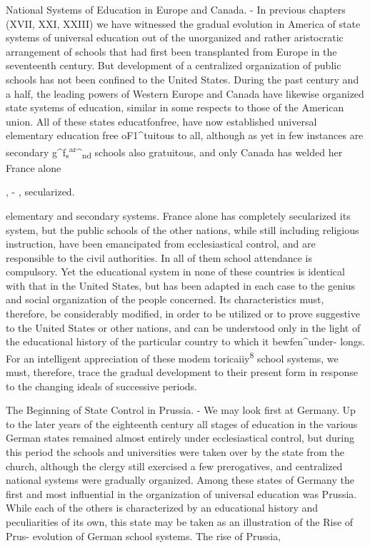 \documentclass[
]{book}
\begin{document}
National Systems of Education in Europe and Canada. - In previous chapters (XVII, XXI, XXIII) we have witnessed the gradual evolution in America of state systems of universal education out of the unorganized and rather aristocratic arrangement of schools that had first been transplanted from Europe in the seventeenth century. But development of a centralized organization of public schools has not been confined to the United States. During the past century and a half, the leading powers of Western Europe and Canada have likewise organized state systems of education, similar in some respects to those of the American union. All of these states educatfonfree, have now established universal elementary education free oF1\^{}tuitous to all, although as yet in few instances are secondary g\^{}f\textsubscript{s}\textsuperscript{ar}\^{}\textsubscript{nd} schools also gratuitous, and only Canada has welded her France alone

, - , secularized.

elementary and secondary systems. France alone has completely secularized its system, but the public schools of the other nations, while still including religious instruction, have been emancipated from ecclesiastical control, and are responsible to the civil authorities. In all of them school attendance is compulsory. Yet the educational system in none of these countries is identical with that in the United States, but has been adapted in each case to the genius and social organization of the people concerned. Its characteristics must, therefore, be considerably modified, in order to be utilized or to prove suggestive to the United States or other nations, and can be understood only in the light of the educational history of the particular country to which it bewfen\^{}under- longs. For an intelligent appreciation of these modem toricaiiy\textsuperscript{8} school systems, we must, therefore, trace the gradual development to their present form in response to the changing ideals of successive periods.

The Beginning of State Control in Prussia. - We may look first at Germany. Up to the later years of the eighteenth century all stages of education in the various German states remained almost entirely under ecclesiastical control, but during this period the schools and universities were taken over by the state from the church, although the clergy still exercised a few prerogatives, and centralized national systems were gradually organized. Among these states of Germany the first and most influential in the organization of universal education was Prussia. While each of the others is characterized by an educational history and peculiarities of its own, this state may be taken as an illustration of the Rise of Prus- evolution of German school systems. The rise of Prussia,
\end{document}
